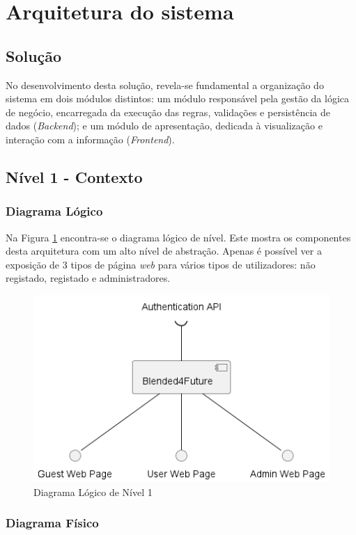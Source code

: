 \section{Arquitetura do sistema}


\subsection{Solução}

No desenvolvimento desta solução, revela-se fundamental a organização do sistema em dois módulos distintos: um módulo responsável pela gestão da lógica de negócio, encarregada da execução das regras, validações e persistência de dados (\textit{Backend}); e um módulo de apresentação, dedicada à visualização e interação com a informação (\textit{Frontend}).

\subsection{Nível 1 - Contexto}

\subsubsection{Diagrama Lógico}

Na Figura \ref{fig:diagram-lvl1-logical} encontra-se o diagrama lógico de nível. Este mostra os componentes desta arquitetura com um alto nível de abstração. Apenas é possível ver a exposição de 3 tipos de página \textit{web} para vários tipos de utilizadores: não registado, registado e administradores.   

\begin{figure}[h!tbp]
    \centering
    \includegraphics[width=0.5\linewidth]{capitulos/cap3-analisedoproblema/assets/arquiteturasistema/logical/logical_l1.png}
    \caption{Diagrama Lógico de Nível 1}
    \label{fig:diagram-lvl1-logical}
\end{figure}

\subsubsection{Diagrama Físico} 

